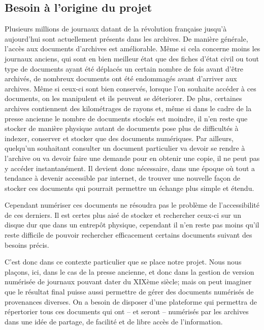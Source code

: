     \subsection{Besoin à l'origine du projet}
    \label{subsec:besoin}
    Plusieurs millions de journaux datant de la révolution française jusqu’à aujourd’hui sont actuellement
    présents dans les archives. De manière générale, l’accès aux documents d’archives est améliorable.
    Même si cela concerne moins les journaux anciens, qui sont en bien meilleur état que des fiches
    d’état civil ou tout type de documents ayant été déplacés un certain nombre de fois avant d’être archivés,
    de nombreux documents ont été endommagés avant d’arriver aux archives. Même si ceux-ci sont bien conservés,
    lorsque l’on souhaite accéder à ces documents, on les manipulent et ils peuvent se déteriorer.
    De plus, certaines archives contiennent des kilométrages de rayons et, même si dans le cadre de la presse ancienne
    le nombre de documents stockés est moindre, il n’en reste que stocker de manière physique autant
    de documents pose plus de difficultés à indexer, conserver et stocker que des documents numériques.
    Par ailleurs, quelqu’un souhaitant consulter un document particulier va devoir se rendre à l’archive ou va devoir
    faire une demande pour en obtenir une copie, il ne peut pas y accéder instantanément. Il devient donc nécessaire,
    dans une époque où tout a tendance à devenir accessible par internet, de trouver une nouvelle façon de stocker
    ces documents qui pourrait permettre un échange plus simple et étendu.

    \pagebreak

    Cependant numériser ces documents ne résoudra pas le problème de l’accessibilité de ces derniers. Il est certes
    plus aisé de stocker et rechercher ceux-ci sur un disque dur que dans un entrepôt physique, cependant il n’en
    reste pas moins qu’il reste difficile de pouvoir rechercher efficacement certains documents suivant des besoins précis.

    C’est donc dans ce contexte particulier que se place notre projet. Nous nous plaçons, ici, dans le cas
    de la presse ancienne, et donc dans la gestion de version numérisée de journaux pouvant dater
    du XIXème siècle; mais on peut imaginer que le résultat final puisse aussi permettre de gérer
    des documents numérisés de provenances diverses. On a besoin de disposer d’une plateforme
    qui permettra de répertorier tous ces documents qui ont – et seront – numérisés par les archives
    dans une idée de partage, de facilité et de libre accès de l’information.
